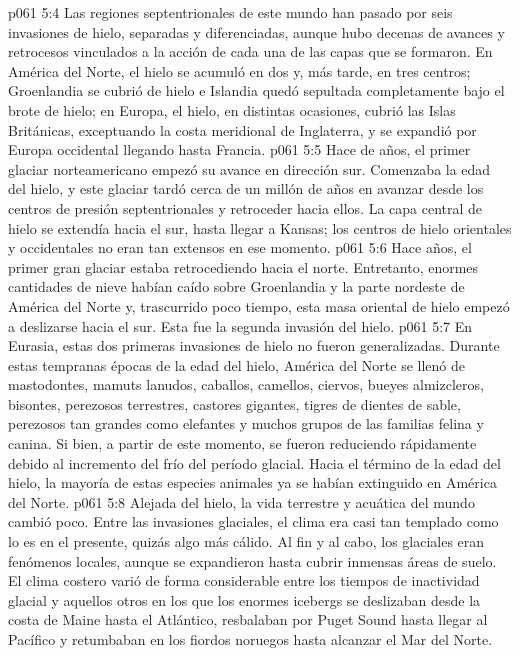 \vs p061 5:4 Las regiones septentrionales de este mundo han pasado por seis invasiones de hielo, separadas y diferenciadas, aunque hubo decenas de avances y retrocesos vinculados a la acción de cada una de las capas que se formaron. En América del Norte, el hielo se acumuló en dos y, más tarde, en tres centros; Groenlandia se cubrió de hielo e Islandia quedó sepultada completamente bajo el brote de hielo; en Europa, el hielo, en distintas ocasiones, cubrió las Islas Británicas, exceptuando la costa meridional de Inglaterra, y se expandió por Europa occidental llegando hasta Francia.
\vs p061 5:5 \pc Hace  de años, el primer glaciar norteamericano empezó su avance en dirección sur. Comenzaba la edad del hielo, y este glaciar tardó cerca de un millón de años en avanzar desde los centros de presión septentrionales y retroceder hacia ellos. La capa central de hielo se extendía hacia el sur, hasta llegar a Kansas; los centros de hielo orientales y occidentales no eran tan extensos en ese momento.
\vs p061 5:6 \pc Hace  años, el primer gran glaciar estaba retrocediendo hacia el norte. Entretanto, enormes cantidades de nieve habían caído sobre Groenlandia y la parte nordeste de América del Norte y, trascurrido poco tiempo, esta masa oriental de hielo empezó a deslizarse hacia el sur. Esta fue la segunda invasión del hielo.
\vs p061 5:7 En Eurasia, estas dos primeras invasiones de hielo no fueron generalizadas. Durante estas tempranas épocas de la edad del hielo, América del Norte se llenó de mastodontes, mamuts lanudos, caballos, camellos, ciervos, bueyes almizcleros, bisontes, perezosos terrestres, castores gigantes, tigres de dientes de sable, perezosos tan grandes como elefantes y muchos grupos de las familias felina y canina. Si bien, a partir de este momento, se fueron reduciendo rápidamente debido al incremento del frío del período glacial. Hacia el término de la edad del hielo, la mayoría de estas especies animales ya se habían extinguido en América del Norte.
\vs p061 5:8 Alejada del hielo, la vida terrestre y acuática del mundo cambió poco. Entre las invasiones glaciales, el clima era casi tan templado como lo es en el presente, quizás algo más cálido. Al fin y al cabo, los glaciales eran fenómenos locales, aunque se expandieron hasta cubrir inmensas áreas de suelo. El clima costero varió de forma considerable entre los tiempos de inactividad glacial y aquellos otros en los que los enormes icebergs se deslizaban desde la costa de Maine hasta el Atlántico, resbalaban por Puget Sound hasta llegar al Pacífico y retumbaban en los fiordos noruegos hasta alcanzar el Mar del Norte.
